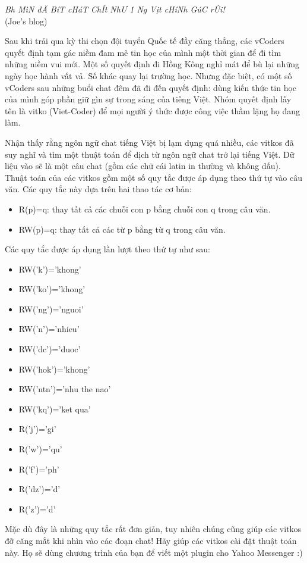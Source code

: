 \textit{    Bh MìN đÃ BíT cHáT ChÍt NhƯ 1 Ng Vịt cHíNh GúC rÙi!   }
\\   (Joe's blog)    

   Sau khi trải qua kỳ thi chọn đội tuyển Quốc tế đầy căng thẳng, các vCoders quyết định tạm gác niềm đam mê tin học của mình một thời gian để đi tìm những niềm vui mới. Một số quyết định đi Hồng Kông nghỉ mát để bù lại những ngày học hành vất vả. Số khác quay lại trường học. Nhưng đặc biệt, có một số vCoders sau những buổi chat đêm đã đi đến quyết định: dùng kiến thức tin học của mình góp phần giữ gìn sự trong sáng của tiếng Việt. Nhóm quyết định lấy tên là vitko (Viet-Coder) để mọi người ý thức được công việc thầm lặng họ đang làm.  

   Nhận thấy rằng ngôn ngữ chat tiếng Việt bị lạm dụng quá nhiều, các vitkos đã suy nghĩ và tìm một thuật toán để dịch từ ngôn ngữ chat trở lại tiếng Việt. Dữ liệu vào sẽ là một câu chat (gồm các chữ cái latin in thường và không dấu). Thuật toán của các vitkos gồm một số quy tắc được áp dụng theo thứ tự vào câu văn. Các quy tắc này dựa trên hai thao tác cơ bản:  
\begin{itemize}
	\item     R(p)=q: thay tất cả các chuỗi con p bằng chuỗi con q trong câu văn.   
	\item     RW(p)=q: thay tất cả các từ p bằng từ q trong câu văn.   
\end{itemize}

   Các quy tắc được áp dụng lần lượt theo thứ tự như sau:  
\begin{itemize}
	\item     RW('k')='khong'   
	\item     RW('ko')='khong'   
	\item     RW('ng')='nguoi'   
	\item     RW('n')='nhieu'   
	\item     RW('dc')='duoc'   
	\item     RW('hok')='khong'   
	\item     RW('ntn')='nhu the nao'   
	\item     RW('kq')='ket qua'   
	\item     R('j')='gi'   
	\item     R('w')='qu'   
	\item     R('f')='ph'   
	\item     R('dz')='d'   
	\item     R('z')='d'   
\end{itemize}

   Mặc dù đây là những quy tắc rất đơn giản, tuy nhiên chúng cũng giúp các vitkos đỡ căng mắt khi nhìn vào các đoạn chat! Hãy giúp các vitkos cài đặt thuật toán này. Họ sẽ dùng chương trình của bạn để viết một plugin cho Yahoo Messenger :)
